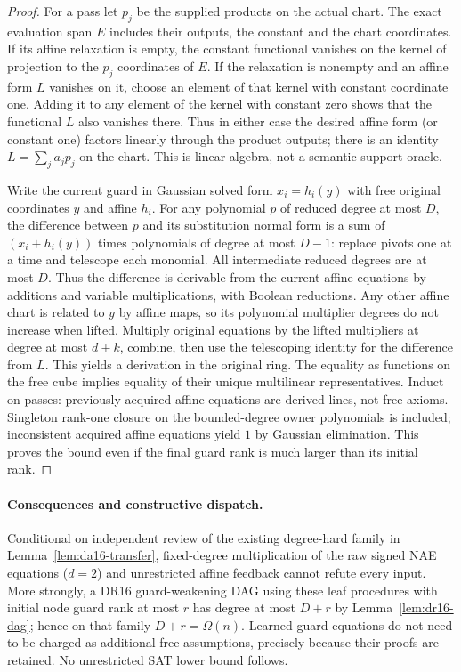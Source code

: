 \documentclass[11pt]{article}
\begin{document}
\begin{proof}
For a pass let $p_j$ be the supplied products on the actual chart. The exact evaluation span $E$ includes their outputs, the constant and the chart coordinates. If its affine relaxation is empty, the constant functional vanishes on the kernel of projection to the $p_j$ coordinates of $E$. If the relaxation is nonempty and an affine form $L$ vanishes on it, choose an element of that kernel with constant coordinate one. Adding it to any element of the kernel with constant zero shows that the functional $L$ also vanishes there. Thus in either case the desired affine form (or constant one) factors linearly through the product outputs; there is an identity $L=\sum_j a_jp_j$ on the chart. This is linear algebra, not a semantic support oracle.

Write the current guard in Gaussian solved form $x_i=h_i(y)$ with free original coordinates $y$ and affine $h_i$. For any polynomial $p$ of reduced degree at most $D$, the difference between $p$ and its substitution normal form is a sum of $(x_i+h_i(y))$ times polynomials of degree at most $D-1$: replace pivots one at a time and telescope each monomial. All intermediate reduced degrees are at most $D$. Thus the difference is derivable from the current affine equations by additions and variable multiplications, with Boolean reductions. Any other affine chart is related to $y$ by affine maps, so its polynomial multiplier degrees do not increase when lifted. Multiply original equations by the lifted multipliers at degree at most $d+k$, combine, then use the telescoping identity for the difference from $L$. This yields a derivation in the original ring. The equality as functions on the free cube implies equality of their unique multilinear representatives. Induct on passes: previously acquired affine equations are derived lines, not free axioms. Singleton rank-one closure on the bounded-degree owner polynomials is included; inconsistent acquired affine equations yield $1$ by Gaussian elimination. This proves the bound even if the final guard rank is much larger than its initial rank.
\end{proof}
\paragraph{Consequences and constructive dispatch.}
Conditional on independent review of the existing degree-hard family in Lemma~\ref{lem:da16-transfer}, fixed-degree multiplication of the raw signed NAE equations ($d=2$) and unrestricted affine feedback cannot refute every input. More strongly, a DR16 guard-weakening DAG using these leaf procedures with initial node guard rank at most $r$ has degree at most $D+r$ by Lemma~\ref{lem:dr16-dag}; hence on that family $D+r=\Omega(n)$. Learned guard equations do not need to be charged as additional free assumptions, precisely because their proofs are retained. No unrestricted SAT lower bound follows.
\end{document}

